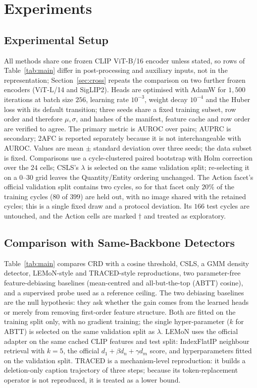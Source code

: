\section{Experiments}
\label{sec:exp}

\subsection{Experimental Setup}
All methods share one frozen CLIP ViT-B/16 encoder unless stated, so rows of
Table~\ref{tab:main} differ in post-processing and auxiliary inputs, not in the
representation; Section~\ref{sec:cross} repeats the comparison on two further frozen
encoders (ViT-L/14 and SigLIP2). Heads are optimised with AdamW for $1{,}500$ iterations at batch size
$256$, learning rate $10^{-3}$, weight decay $10^{-4}$ and the Huber loss with its
default transition; three seeds share a fixed training subset, row order and therefore
$\mu,\sigma$, and hashes of the manifest, feature cache and row order are verified to
agree. The primary metric is AUROC over pairs; AUPRC is secondary; 2AFC is reported
separately because it is not interchangeable with AUROC. Values are mean $\pm$
standard deviation over three seeds; the data subset is fixed. Comparisons use a cycle-clustered paired
bootstrap with Holm correction over the $24$ cells;
CSLS's $\lambda$ is selected on the same validation split; re-selecting it on a
$0$--$30$ grid leaves the Quantity/Entity ordering unchanged. The Action facet's
official validation split contains two cycles, so for that facet only $20\%$ of the
training cycles ($80$ of $399$) are held out, with no image shared with the retained
cycles; this is a single fixed draw and a protocol deviation. Its $166$ test cycles
are untouched, and the Action cells are marked $\dagger$ and treated as exploratory.

\subsection{Comparison with Same-Backbone Detectors}
Table~\ref{tab:main} compares CRD with a cosine threshold, CSLS, a GMM density
detector, LEMoN-style and TRACED-style reproductions, two parameter-free
feature-debiasing baselines (mean-centred and all-but-the-top (ABTT) cosine), and a
supervised probe used as a reference ceiling. The
two debiasing baselines are the null hypothesis: they ask whether the gain comes from
the learned heads or merely from removing first-order feature structure. Both are
fitted on the training split only, with no gradient training; the single
hyper-parameter ($k$ for ABTT) is selected on the same validation split as $\lambda$.
LEMoN uses the official adapter on the same cached CLIP features and test split:
IndexFlatIP neighbour retrieval with $k{=}5$, the official
$d_1+\beta d_n+\gamma d_m$ score, and hyperparameters fitted on the validation split.
TRACED is a mechanism-level reproduction: it builds a deletion-only caption trajectory
of three steps; because its token-replacement operator is not reproduced, it is treated
as a lower bound.

